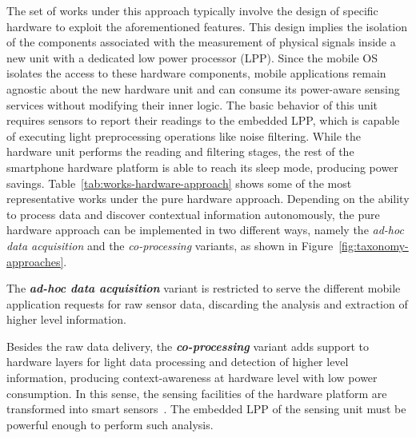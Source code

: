 \documentclass[ENG,PhD]{cinvestav}
\begin{document}
The set of works under this approach typically involve the design of specific hardware to exploit the aforementioned features.
This design implies the isolation of the components associated with the measurement of physical signals inside a new unit with a dedicated low power processor (LPP).
Since the mobile OS isolates the access to these hardware components, mobile applications remain agnostic about the new hardware unit and can consume its power-aware sensing services without modifying their inner logic.
The basic behavior of this unit requires sensors to report their readings to the embedded LPP, which is capable of executing light preprocessing operations like noise filtering.
While the hardware unit performs the reading and filtering stages, the rest of the smartphone hardware platform is able to reach its sleep mode, producing power savings.
Table~\ref{tab:works-hardware-approach} shows some of the most representative works under the pure hardware approach.
Depending on the ability to process data and discover contextual information autonomously, the pure hardware approach can be implemented in two different ways, namely the \emph{ad-hoc data acquisition} and the \emph{co-processing} variants, as shown in Figure~\ref{fig:taxonomy-approaches}.



The \emph{\textbf{ad-hoc data acquisition}} variant is restricted to serve the different mobile application requests for raw sensor data, discarding the analysis and extraction of higher level information.

Besides the raw data delivery, the \emph{\textbf{co-processing}} variant adds support to hardware layers for light data processing and detection of higher level information, producing context-awareness at hardware level with low power consumption.
In this sense, the sensing facilities of the hardware platform are transformed into smart sensors~\cite{Gervais-Ducouret2011}.
The embedded LPP of the sensing unit must be powerful enough to perform such analysis.
\end{document}

